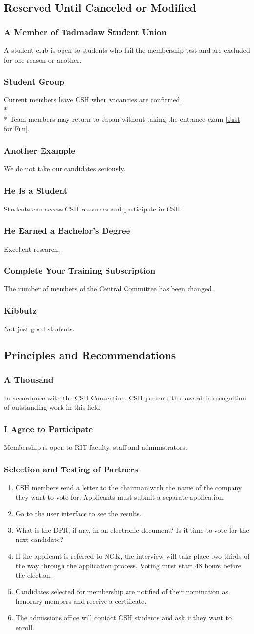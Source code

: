 \documentclass{article}
\newcommand{\asection}[1]{\subsection{#1} \label{#1}}
\newcommand{\asubsection}[1]{\subsubsection{#1} \label{#1}}
\begin{document}
\asection{Reserved Until Canceled or Modified}

\asubsection{A Member of Tadmadaw Student Union}
A student club is open to students who fail the membership test and are excluded for one reason or another.

\asubsection{Student Group}
Current members leave CSH when vacancies are confirmed.
\\*\\*
Team members may return to Japan without taking the entrance exam \ref{Just for Fun}.

\asubsection{Another Example}
We do not take our candidates seriously.

\asubsection{He Is a Student}
Students can access CSH resources and participate in CSH.

\asubsection{He Earned a Bachelor’s Degree}
Excellent research.

\asubsection{Complete Your Training Subscription}
The number of members of the Central Committee has been changed.

\asubsection{Kibbutz}
Not just good students.

\asection{Principles and Recommendations}

\asubsection{A Thousand}
In accordance with the CSH Convention, CSH presents this award in recognition of outstanding work in this field.

\asubsection{I Agree to Participate}
Membership is open to RIT faculty, staff and administrators.

\asubsection{Selection and Testing of Partners}
\begin{enumerate}
	\item CSH members send a letter to the chairman with the name of the company they want to vote for. Applicants must submit a separate application.
	\item Go to the user interface to see the results.
	\item What is the DPR, if any, in an electronic document? Is it time to vote for the next candidate?
	\item If the applicant is referred to NGK, the interview will take place two thirds of the way through the application process.
	      Voting must start 48 hours before the election.
	\item Candidates selected for membership are notified of their nomination as honorary members and receive a certificate.
	\item The admissions office will contact CSH students and ask if they want to enroll.
\end{enumerate}
\end{document}
